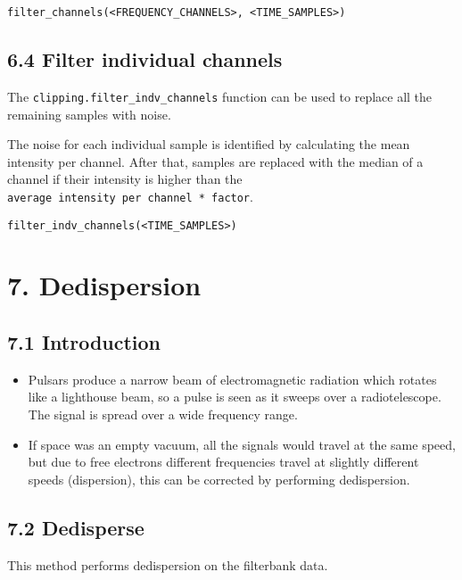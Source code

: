 \documentclass[]{article}
\begin{document}
\begin{verbatim}
filter_channels(<FREQUENCY_CHANNELS>, <TIME_SAMPLES>)
\end{verbatim}

\subsection{6.4 Filter individual
channels}\label{filter-individual-channels}

The \texttt{clipping.filter\_indv\_channels} function can be used to
replace all the remaining samples with noise.

The noise for each individual sample is identified by calculating the
mean intensity per channel. After that, samples are replaced with the
median of a channel if their intensity is higher than the
\texttt{average\ intensity\ per\ channel\ *\ factor}.

\begin{verbatim}
filter_indv_channels(<TIME_SAMPLES>)
\end{verbatim}

\section{7. Dedispersion}\label{dedispersion}

\subsection{7.1 Introduction}\label{introduction}

\begin{itemize}
\item
  Pulsars produce a narrow beam of electromagnetic radiation which
  rotates like a lighthouse beam, so a pulse is seen as it sweeps over a
  radiotelescope. The signal is spread over a wide frequency range.
\item
  If space was an empty vacuum, all the signals would travel at the same
  speed, but due to free electrons different frequencies travel at
  slightly different speeds (dispersion), this can be corrected by
  performing dedispersion.
\end{itemize}

\subsection{7.2 Dedisperse}\label{dedisperse}

This method performs dedispersion on the filterbank data.
\end{document}
